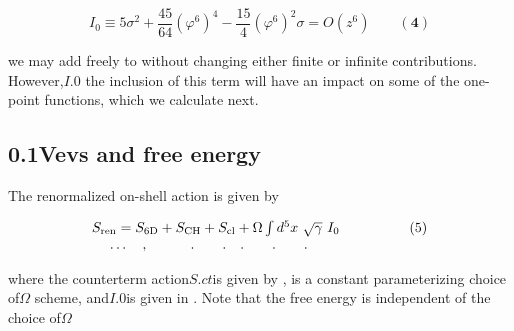 \documentclass{article}
\begin{document}
\begin{equation}
I _ { 0 } \equiv 5 \sigma ^ { 2 } + \frac { 4 5 } { 6 4 } ( \varphi ^ { 6 } ) ^ { 4 } - \frac { 1 5 } { 4 } ( \varphi ^ { 6 } ) ^ { 2 } \sigma = O ( z ^ { 6 } ) \qquad ( \mathbf { 4 } )
\end{equation}


we may add  freely to without changing either finite or infinite contributions. However,$I . { 0 }$
the inclusion of this term will have an impact on some of the one-point functions, which we
calculate next.


\subsection*{0.1Vevs and free energy}


The renormalized on-shell action is given by


\begin{equation}
\begin{array} { c c c } { S _ { \mathrm { r e n } } = S _ { \mathrm { 6 D } } + S _ { \mathrm { C H } } + S _ { \mathrm { c l } } + \Omega \int d ^ { 5 } x ~ \sqrt { \gamma } ~ I _ { 0 } } & { \qquad \qquad ( 5 ) } \\ { \dots \quad, \quad \quad \quad. \quad \quad. \quad. \quad \quad. \quad \quad. \quad } \end{array}
\end{equation}


where the counterterm action$S . { c t }$is given by , is a constant parameterizing choice of$\Omega$
scheme, and$I . { 0 }$is given in . Note that the free energy is independent of the choice of$\Omega$
\end{document}
